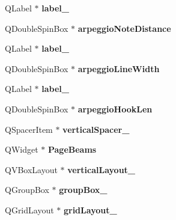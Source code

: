 \begin{DoxyCompactItemize}
Q\+Label $\ast$ {\bfseries label\+\_}
\item 
\mbox{\label{class_ui___edit_style_base_adce573175d92a044e8909dcbb8fad3f6}} 
Q\+Double\+Spin\+Box $\ast$ {\bfseries arpeggio\+Note\+Distance}
\item 
\mbox{\label{class_ui___edit_style_base_a65256a5dcc34a1ff8291b7d0607e98e8}} 
Q\+Label $\ast$ {\bfseries label\+\_}
\item 
\mbox{\label{class_ui___edit_style_base_ac2841ab062cf8d46e656b77773da13a4}} 
Q\+Double\+Spin\+Box $\ast$ {\bfseries arpeggio\+Line\+Width}
\item 
\mbox{\label{class_ui___edit_style_base_acfa5296ba98f38da35bf66f6f2ec1a4b}} 
Q\+Label $\ast$ {\bfseries label\+\_}
\item 
\mbox{\label{class_ui___edit_style_base_a4ce5a38dc8baa2e347785162d630d462}} 
Q\+Double\+Spin\+Box $\ast$ {\bfseries arpeggio\+Hook\+Len}
\item 
\mbox{\label{class_ui___edit_style_base_a64daccc211a0e8a0e6c0724df525b666}} 
Q\+Spacer\+Item $\ast$ {\bfseries vertical\+Spacer\+\_}
\item 
\mbox{\label{class_ui___edit_style_base_a5d22efc791cbeeb220d6edea6267f77f}} 
Q\+Widget $\ast$ {\bfseries Page\+Beams}
\item 
\mbox{\label{class_ui___edit_style_base_a832d109c2bf7165eee405f298bda9b0c}} 
Q\+V\+Box\+Layout $\ast$ {\bfseries vertical\+Layout\+\_}
\item 
\mbox{\label{class_ui___edit_style_base_a0dab643f7c89744e0587308b0c7e01b7}} 
Q\+Group\+Box $\ast$ {\bfseries group\+Box\+\_}
\item 
\mbox{\label{class_ui___edit_style_base_a6b8403469114dc9a88eff6c2570431c3}} 
Q\+Grid\+Layout $\ast$ {\bfseries grid\+Layout\+\_}
\item 

\end{DoxyCompactItemize}
